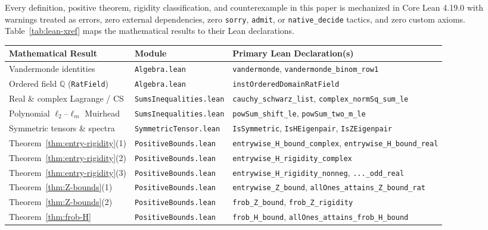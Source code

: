 \documentclass[11pt]{article}
\theoremstyle{definition}
\newcommand{\Q}{\mathbb{Q}}
\begin{document}
Every definition, positive theorem, rigidity classification, and counterexample in this paper is
mechanized in Core Lean 4.19.0 with warnings treated as errors, zero external dependencies,
zero \texttt{sorry}, \texttt{admit}, or \texttt{native\_decide} tactics, and zero custom axioms.
Table~\ref{tab:lean-xref} maps the mathematical results to their Lean declarations.

\begin{table}[ht]
\centering
\footnotesize
\setlength{\tabcolsep}{4.5pt}
\renewcommand{\arraystretch}{1.18}
\begin{tabular}{@{}lll@{}}
\toprule
\textbf{Mathematical Result} & \textbf{Module} & \textbf{Primary Lean Declaration(s)} \\
\midrule
Vandermonde identities & \texttt{Algebra.lean} & \texttt{vandermonde}, \texttt{vandermonde\_binom\_row1} \\
Ordered field $\Q$ (\texttt{RatField}) & \texttt{Algebra.lean} & \texttt{instOrderedDomainRatField} \\
Real \& complex Lagrange / CS & \texttt{SumsInequalities.lean} & \texttt{cauchy\_schwarz\_list}, \texttt{complex\_normSq\_sum\_le} \\
Polynomial $\ell_2$--$\ell_m$ Muirhead & \texttt{SumsInequalities.lean} & \texttt{powSum\_shift\_le}, \texttt{powSum\_two\_m\_le} \\
Symmetric tensors \& spectra & \texttt{SymmetricTensor.lean} & \texttt{IsSymmetric}, \texttt{IsHEigenpair}, \texttt{IsZEigenpair} \\
Theorem~\ref{thm:entry-rigidity}(1) & \texttt{PositiveBounds.lean} & \texttt{entrywise\_H\_bound\_complex}, \texttt{entrywise\_H\_bound\_real} \\
Theorem~\ref{thm:entry-rigidity}(2) & \texttt{PositiveBounds.lean} & \texttt{entrywise\_H\_rigidity\_complex} \\
Theorem~\ref{thm:entry-rigidity}(3) & \texttt{PositiveBounds.lean} & \texttt{entrywise\_H\_rigidity\_nonneg}, \texttt{...\_odd\_real} \\
Theorem~\ref{thm:Z-bounds}(1) & \texttt{PositiveBounds.lean} & \texttt{entrywise\_Z\_bound}, \texttt{allOnes\_attains\_Z\_bound\_rat} \\
Theorem~\ref{thm:Z-bounds}(2) & \texttt{PositiveBounds.lean} & \texttt{frob\_Z\_bound}, \texttt{frob\_Z\_rigidity} \\
Theorem~\ref{thm:frob-H} & \texttt{PositiveBounds.lean} & \texttt{frob\_H\_bound}, \texttt{allOnes\_attains\_frob\_H\_bound} \\

\end{tabular}
\end{table}
\end{document}
